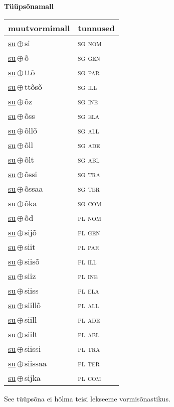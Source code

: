 

\vspace{3.5em}
\noindent \begin{minipage}{\textwidth}
\noindent \textbf{Tüüpsõnamall \,}\\

\begin{sideways}
\begin{tabular}{l l}
muutvormimall & tunnused \\
\hline
\underline{su}\,$\oplus$\,si & \textsc{ sg nom } \\
\underline{su}\,$\oplus$\,õ & \textsc{ sg gen } \\
\underline{su}\,$\oplus$\,ttõ & \textsc{ sg par } \\
\underline{su}\,$\oplus$\,ttõsõ & \textsc{ sg ill } \\
\underline{su}\,$\oplus$\,õz & \textsc{ sg ine } \\
\underline{su}\,$\oplus$\,õss & \textsc{ sg ela } \\
\underline{su}\,$\oplus$\,õllõ & \textsc{ sg all } \\
\underline{su}\,$\oplus$\,õll & \textsc{ sg ade } \\
\underline{su}\,$\oplus$\,õlt & \textsc{ sg abl } \\
\underline{su}\,$\oplus$\,õssi & \textsc{ sg tra } \\
\underline{su}\,$\oplus$\,õssaa & \textsc{ sg ter } \\
\underline{su}\,$\oplus$\,õka & \textsc{ sg com } \\
\underline{su}\,$\oplus$\,õd & \textsc{ pl nom } \\
\underline{su}\,$\oplus$\,sijõ & \textsc{ pl gen } \\
\underline{su}\,$\oplus$\,siit & \textsc{ pl par } \\
\underline{su}\,$\oplus$\,siisõ & \textsc{ pl ill } \\
\underline{su}\,$\oplus$\,siiz & \textsc{ pl ine } \\
\underline{su}\,$\oplus$\,siiss & \textsc{ pl ela } \\
\underline{su}\,$\oplus$\,siillõ & \textsc{ pl all } \\
\underline{su}\,$\oplus$\,siill & \textsc{ pl ade } \\
\underline{su}\,$\oplus$\,siilt & \textsc{ pl abl } \\
\underline{su}\,$\oplus$\,siissi & \textsc{ pl tra } \\
\underline{su}\,$\oplus$\,siissaa & \textsc{ pl ter } \\
\underline{su}\,$\oplus$\,sijka & \textsc{ pl com } \\
\end{tabular}
\end{sideways}
\label{tab:tüüpsõnamall-susi}

\end{minipage}

 
\vspace{1em}
\noindent See tüüpsõna ei hõlma teisi lekseeme vormi\-sõnastikus.
